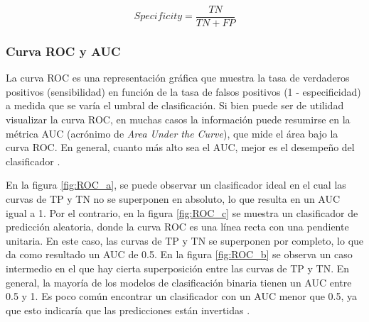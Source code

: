 \begin{equation}
	\label{eq:specificity}
	Specificity = \frac{TN}{TN + FP}
\end{equation}


\subsubsection{Curva ROC y AUC}
La curva ROC es una representación gráfica que muestra la tasa de verdaderos positivos (sensibilidad)
en función de la tasa de falsos positivos (1 - especificidad) a medida que se varía el umbral de 
clasificación. Si bien puede ser de utilidad visualizar la curva ROC, en muchas casos la información 
puede resumirse en la métrica AUC (acrónimo de \emph{Area Under the Curve}), que mide el área bajo la curva 
ROC. En general, cuanto más alto sea el AUC, mejor es el desempeño del clasificador \citep{CITE:37} \citep{CITE:44}. 

En la figura \ref{fig:ROC_a}, se puede observar un clasificador ideal en el cual las curvas de TP y TN no se 
superponen en absoluto, lo que resulta en un AUC igual a 1. Por el contrario, en la figura \ref{fig:ROC_c} 
se muestra un clasificador de predicción aleatoria, donde la curva ROC es una línea recta con una pendiente unitaria. 
En este caso, las curvas de TP y TN se superponen por completo, lo que da como resultado un AUC de 0.5. 
En la figura \ref{fig:ROC_b} se observa un caso intermedio en el que hay cierta superposición entre las curvas 
de TP y TN. En general, la mayoría de los modelos de clasificación binaria tienen un AUC entre 0.5 y 1. Es poco 
común encontrar un clasificador con un AUC menor que 0.5, ya que esto indicaría que las predicciones están invertidas \citep{CITE:44}.


